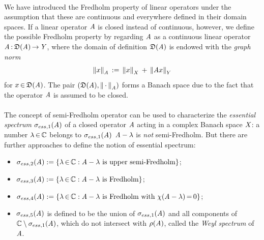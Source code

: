 \documentclass[11pt,twoside]{article}
\begin{document}
\paragraph{} %
We have introduced the Fredholm property of linear operators
under the assumption that
these are continuous and everywhere defined in their domain spaces.
If a linear operator $\mathit{A}$ is closed instead of continuous,
however,
we define the possible Fredholm property by regarding
$\mathit{A}$ as a continuous linear operator $\mathit{A} {\,:\,} \mathfrak{D}(\mathit{A}) {\,\to\,} \mathit{Y}$,
where the domain of definition $\mathfrak{D}(\mathit{A})$ is endowed
with the \textit{graph norm}
\[
\left\lVert x \right\rVert_{\mathit{A}} \,:=\, \left\lVert x \right\rVert_X \,+\, \left\lVert \mathit{A} x \right\rVert_Y
\]
for $x {\,\in\,} \mathfrak{D}(\mathit{A})$.
The pair $(\mathfrak{D}(\mathit{A}),\left\lVert \,\cdot\, \right\rVert_{\mathit{A}})$
forms a Banach space due to the fact that
the operator $\mathit{A}$ is assumed to be closed.

\paragraph{} %
The concept of semi-Fredholm operator can be used to characterize
the \textit{essential spectrum} $\sigma_{ess,1}(\mathit{A})$
of a closed operator $\mathit{A}$ acting in a complex Banach space $\mathit{X}$:
a number $\lambda {\,\in\,} {\mathbb{C}}$ belongs to $\sigma_{ess,1}(\mathit{A})$
\iff $\mathit{A} - \lambda$ is \textit{not} semi-Fredholm.
But there are further approaches to define the notion of essential spectrum:

\begin{itemize}[leftmargin=6mm]
\item[-] 
$\sigma_{ess,2}(\mathit{A}) := \{\lambda {\,\in\,} {\mathbb{C}}:
\mathit{A}-\lambda \mbox{ is upper semi-Fredholm} \}$;

\item[-] 
$\sigma_{ess,3}(\mathit{A}) := \{\lambda {\,\in\,} {\mathbb{C}}:
\mathit{A}-\lambda \mbox{ is Fredholm} \}$;

\item[-] 
$\sigma_{ess,4}(\mathit{A}) := \{\lambda {\,\in\,} {\mathbb{C}}:
\mathit{A}-\lambda \mbox{ is Fredholm with } \chi(\mathit{A}-\lambda) {\,=\,} 0\}$;

\item[-] 
$\sigma_{ess,5}(\mathit{A})$ is defined to be the union of $\sigma_{ess,1}(\mathit{A})$
and all components of ${\mathbb{C}} \setminus \sigma_{ess,1}(\mathit{A})$,
which do not intersect with $\rho(\mathit{A})$,
called the \textit{Weyl spectrum} of $\mathit{A}$.
\end{itemize}
\end{document}
